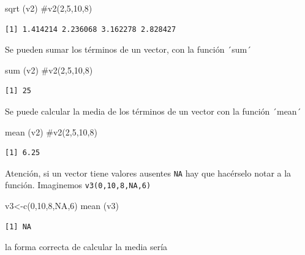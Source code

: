 \documentclass[
  letterpaper,
]{scrbook}
\newenvironment{Shaded}{\begin{snugshade}}{\end{snugshade}}
\newcommand{\CommentTok}[1]{\textcolor[rgb]{0.37,0.37,0.37}{#1}}
\newcommand{\ConstantTok}[1]{\textcolor[rgb]{0.56,0.35,0.01}{#1}}
\newcommand{\DecValTok}[1]{\textcolor[rgb]{0.68,0.00,0.00}{#1}}
\newcommand{\FunctionTok}[1]{\textcolor[rgb]{0.28,0.35,0.67}{#1}}
\newcommand{\NormalTok}[1]{\textcolor[rgb]{0.00,0.23,0.31}{#1}}
\newcommand{\OtherTok}[1]{\textcolor[rgb]{0.00,0.23,0.31}{#1}}
\begin{document}
\begin{Shaded}
\begin{Highlighting}[]
\FunctionTok{sqrt}\NormalTok{ (v2) }\CommentTok{\#v2(2,5,10,8)}
\end{Highlighting}
\end{Shaded}

\begin{verbatim}
[1] 1.414214 2.236068 3.162278 2.828427
\end{verbatim}

Se pueden sumar los términos de un vector, con la función ´sum´

\begin{Shaded}
\begin{Highlighting}[]
\FunctionTok{sum}\NormalTok{ (v2) }\CommentTok{\#v2(2,5,10,8) }
\end{Highlighting}
\end{Shaded}

\begin{verbatim}
[1] 25
\end{verbatim}

Se puede calcular la media de los términos de un vector con la función
´mean´

\begin{Shaded}
\begin{Highlighting}[]
\FunctionTok{mean}\NormalTok{ (v2) }\CommentTok{\#v2(2,5,10,8)}
\end{Highlighting}
\end{Shaded}

\begin{verbatim}
[1] 6.25
\end{verbatim}

Atención, si un vector tiene valores ausentes \texttt{NA} hay que
hacérselo notar a la función. Imaginemos \texttt{v3(0,10,8,NA,6)}

\begin{Shaded}
\begin{Highlighting}[]
\NormalTok{v3}\OtherTok{\textless{}{-}}\FunctionTok{c}\NormalTok{(}\DecValTok{0}\NormalTok{,}\DecValTok{10}\NormalTok{,}\DecValTok{8}\NormalTok{,}\ConstantTok{NA}\NormalTok{,}\DecValTok{6}\NormalTok{)}
\FunctionTok{mean}\NormalTok{ (v3)}
\end{Highlighting}
\end{Shaded}

\begin{verbatim}
[1] NA
\end{verbatim}

la forma correcta de calcular la media sería
\end{document}
